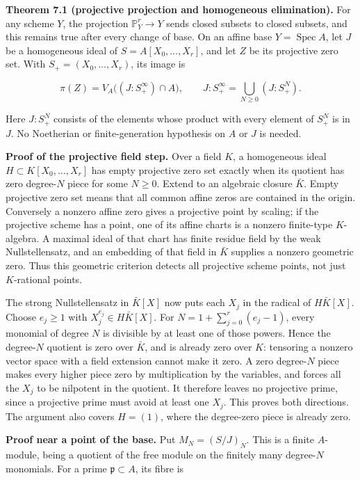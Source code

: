 \documentclass[
]{article}
\begin{document}
\textbf{Theorem 7.1 (projective projection and homogeneous
elimination).} For any scheme \(Y\), the projection
\(\mathbb P^r_Y\to Y\) sends closed subsets to closed subsets, and this
remains true after every change of base. On an affine base
\(Y=\operatorname{Spec}A\), let \(J\) be a homogeneous ideal of
\(S=A[X_0,\ldots,X_r]\), and let \(Z\) be its projective zero set. With
\(S_+=(X_0,\ldots,X_r)\), its image is

\[
\pi(Z)=V_A\bigl((J:S_+^\infty)\cap A\bigr),
\qquad
J:S_+^\infty=\bigcup_{N\ge0}(J:S_+^N).
\tag{10}
\]

Here \(J:S_+^N\) consists of the elements whose product with every
element of \(S_+^N\) is in \(J\). No Noetherian or finite-generation
hypothesis on \(A\) or \(J\) is needed.

\textbf{Proof of the projective field step.} Over a field \(K\), a
homogeneous ideal \(H\subset K[X_0,\ldots,X_r]\) has empty projective
zero set exactly when its quotient has zero degree-\(N\) piece for some
\(N\ge0\). Extend to an algebraic closure \(\bar K\). Empty projective
zero set means that all common affine zeros are contained in the origin.
Conversely a nonzero affine zero gives a projective point by scaling; if
the projective scheme has a point, one of its affine charts is a nonzero
finite-type \(K\)-algebra. A maximal ideal of that chart has finite
residue field by the weak Nullstellensatz, and an embedding of that
field in \(\bar K\) supplies a nonzero geometric zero. Thus this
geometric criterion detects all projective scheme points, not just
\(K\)-rational points.

The strong Nullstellensatz in \(\bar K[X]\) now puts each \(X_j\) in the
radical of \(H\bar K[X]\). Choose \(e_j\ge1\) with
\(X_j^{e_j}\in H\bar K[X]\). For \(N=1+\sum_{j=0}^r(e_j-1)\), every
monomial of degree \(N\) is divisible by at least one of those powers.
Hence the degree-\(N\) quotient is zero over \(\bar K\), and is already
zero over \(K\): tensoring a nonzero vector space with a field extension
cannot make it zero. A zero degree-\(N\) piece makes every higher piece
zero by multiplication by the variables, and forces all the \(X_j\) to
be nilpotent in the quotient. It therefore leaves no projective prime,
since a projective prime must avoid at least one \(X_j\). This proves
both directions. The argument also covers \(H=(1)\), where the
degree-zero piece is already zero.

\textbf{Proof near a point of the base.} Put \(M_N=(S/J)_N\). This is a
finite \(A\)-module, being a quotient of the free module on the finitely
many degree-\(N\) monomials. For a prime \(\mathfrak p\subset A\), its
fibre is
\end{document}
